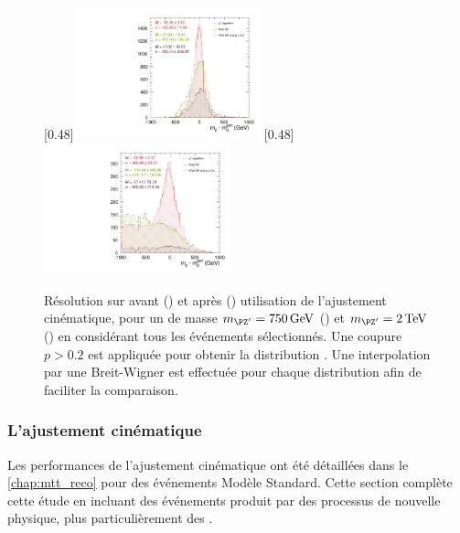 \begin{figure}[tbp] \centering
    \subcaptionbox{\label{fig:kf_zp_750}}[0.48\textwidth]{\includegraphics[width=0.48\textwidth,angle=-90,origin=c]{chapitre7/figs/kinfit/mtt_resolution_comparison_kf_zp750_all_events.pdf}} \hfill
    \subcaptionbox{\label{fig:kf_zp_2000}}[0.48\textwidth]{\includegraphics[width=0.48\textwidth,angle=-90,origin=c]{chapitre7/figs/kinfit/mtt_resolution_comparison_kf_zp2000_all_events.pdf}}
    \caption{Résolution sur \mtt avant (\rouge) et après (\vertc) utilisation de l'ajustement cinématique, pour un \zprime de masse $\mzp = \SI{750}{\GeV}$ () et $\mzp = \SI{2}{\TeV}$ () en considérant tous les événements sélectionnés. Une coupure $p > \num{0.2}$ est appliquée pour obtenir la distribution \violette. Une interpolation par une Breit-Wigner est effectuée pour chaque distribution afin de faciliter la comparaison.}
    \label{fig:kf_zp}
\end{figure}

\subsubsection{L'ajustement cinématique}

Les performances de l'ajustement cinématique ont été détaillées dans le \cref{chap:mtt_reco} pour des événements \ttbar Modèle Standard. Cette section complète cette étude en incluant des événements \ttbar produit par des processus de nouvelle physique, plus particulièrement des \zprime.

\medskip

